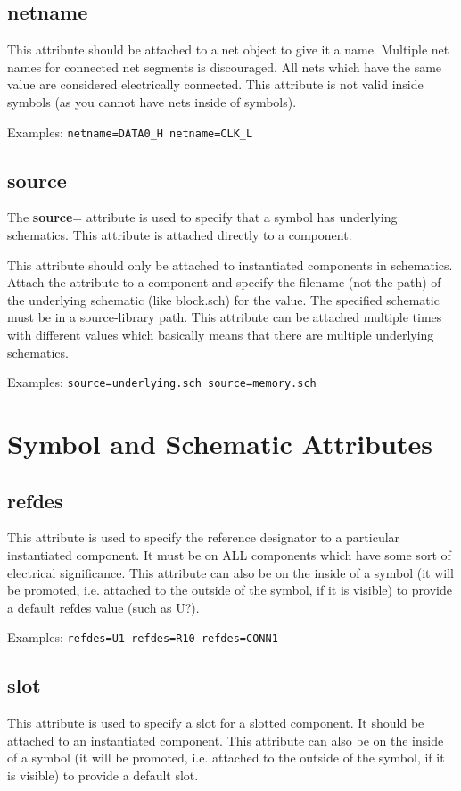 \documentclass{article}
\begin{document}
\subsection{{\bf netname}\label{netname}}
This attribute should be attached to a net object to give it a name.
Multiple net names for connected net segments is discouraged.  All nets
which have the same value are considered electrically connected.  This
attribute is not valid inside symbols (as you cannot have nets inside
of symbols).

Examples: \texttt{netname=DATA0\_H netname=CLK\_L}


\subsection{{\bf source}\label{source}}
The {\bf source}= attribute is used to specify that a symbol has underlying
schematics.  This attribute is attached directly to a component.

This attribute should only be attached to instantiated components
in schematics.  Attach the attribute to a component and specify the
filename (not the path) of the underlying schematic (like block.sch)
for the value.  The specified schematic must be in a source-library path.
This attribute can be attached multiple times with different values
which basically means that there are multiple underlying schematics.

Examples: \texttt{source=underlying.sch source=memory.sch}


\section{Symbol and Schematic Attributes}

\subsection{{\bf refdes}\label{refdes}}
This attribute is used to specify the reference designator to a particular
instantiated component.  It must be on ALL components which have some
sort of electrical significance.  This attribute can also be on the
inside of a symbol (it will be promoted, i.e. attached to the outside of
the symbol, if it is visible) to provide a default refdes value (such as
U?).

Examples: \texttt{refdes=U1 refdes=R10 refdes=CONN1}

\subsection{{\bf slot}\label{slot}}
This attribute is used to specify a slot for a slotted component.
It should be attached to an instantiated component.  This attribute can
also be on the inside of a symbol (it will be promoted, i.e. attached
to the outside of the symbol, if it is visible) to provide a default
slot.
\end{document}
